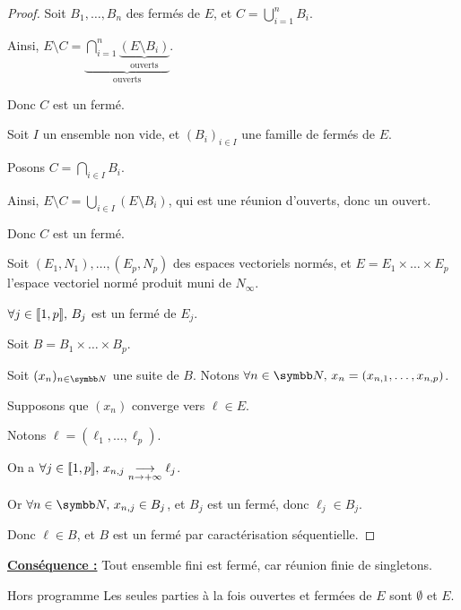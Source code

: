 \begin{proof}
    Soit $B_1, \dots, B_n$ des fermés de $E$, et $\displaystyle C = \bigcup_{i=1}^n B_i$.

    Ainsi, $E \setminus C = \underbrace{\bigcap_{i=1}^n \underbrace{(E \setminus B_i)}_{\text{ouverts}}}_{\text{ouverts}}$.

    Donc $C$ est un fermé.

    \lvspace Soit $I$ un ensemble non vide, et $(B_i)_{i \in I}$ une famille de fermés de $E$.

    Posons $\displaystyle C = \bigcap_{i \in I} B_i$.

    Ainsi, $\displaystyle E \setminus C = \bigcup_{i \in I} (E \setminus B_i)$, qui est une réunion d'ouverts, donc un ouvert.

    Donc $C$ est un fermé.

    \lvspace Soit $(E_1, N_1), \dots, (E_p, N_p)$ des espaces vectoriels normés, et
    $E = E_1 \times \dots \times E_p$ l'espace vectoriel normé produit muni de $N_\infty$.

    $\forall j \in [\![1, p]\!], \, B_j$ est un fermé de $E_j$.

    Soit $B = B_1 \times \dots \times B_p$. 

    Soit $(x_n)_{n \in \N}$ une suite de $B$. Notons $\forall n \in \N, \, x_n = (x_{n, 1}, \dots, x_{n, p})$.

    Supposons que $(x_n)$ converge vers $\ell \in E$. 

    Notons $\ell = (\ell_1, \dots, \ell_p)$.

    On a $\forall j \in [\![1, p]\!], \, x_{n, j} \underset{n \to + \infty}{\longrightarrow} \ell_j$.

    Or $\forall n \in \N, \, x_{n, j} \in B_j$, et $B_j$ est un fermé, donc $\ell_j \in B_j$.

    Donc $\ell \in B$, et $B$ est un fermé par caractérisation séquentielle.
\end{proof}

\textbf{\uline{Conséquence :}}
Tout ensemble fini est fermé, car réunion finie de singletons.

\begin{theoreme}{Hors programme}{}
    Les seules parties à la fois ouvertes et fermées de $E$ sont $\emptyset$ et $E$.
\end{theoreme}


